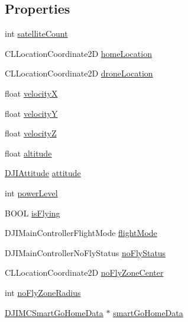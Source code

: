 \subsection*{Properties}
\begin{DoxyCompactItemize}
\item 
int \hyperlink{interface_d_j_i_m_c_system_state_a1d8684af50d70620b9166d2c6a469f63}{satellite\+Count}
\item 
C\+L\+Location\+Coordinate2\+D \hyperlink{interface_d_j_i_m_c_system_state_a4395f4e24d0f084407cf99fdf4d630b2}{home\+Location}
\item 
C\+L\+Location\+Coordinate2\+D \hyperlink{interface_d_j_i_m_c_system_state_a90f991829772ba3e7bb23811845fb2cc}{drone\+Location}
\item 
float \hyperlink{interface_d_j_i_m_c_system_state_a325798d4e0c80ec568fdf36ce1098901}{velocity\+X}
\item 
float \hyperlink{interface_d_j_i_m_c_system_state_aa41385209d9edaef3f4d6ee6385b471b}{velocity\+Y}
\item 
float \hyperlink{interface_d_j_i_m_c_system_state_ab2bee010d83187db9a3ded5456494e8a}{velocity\+Z}
\item 
float \hyperlink{interface_d_j_i_m_c_system_state_a14fa4428eae3c3c96789a44d41d0a8d8}{altitude}
\item 
\hyperlink{struct_d_j_i_attitude}{D\+J\+I\+Attitude} \hyperlink{interface_d_j_i_m_c_system_state_af6916800ba242ddaa3ede17625224021}{attitude}
\item 
int \hyperlink{interface_d_j_i_m_c_system_state_ab39cb3387140f0642d29d865ba33e166}{power\+Level}
\item 
B\+O\+O\+L \hyperlink{interface_d_j_i_m_c_system_state_a7d0f82dcfa7ba2650c394815a0ce9e06}{is\+Flying}
\item 
D\+J\+I\+Main\+Controller\+Flight\+Mode \hyperlink{interface_d_j_i_m_c_system_state_a7ecc5f31a38b34a94f6680f7fc6f590c}{flight\+Mode}
\item 
D\+J\+I\+Main\+Controller\+No\+Fly\+Status \hyperlink{interface_d_j_i_m_c_system_state_ab1d284a6e00a0fed3c262e69d3b738ab}{no\+Fly\+Status}
\item 
C\+L\+Location\+Coordinate2\+D \hyperlink{interface_d_j_i_m_c_system_state_a1840e97a45fe5f712af878e9aec09e0d}{no\+Fly\+Zone\+Center}
\item 
int \hyperlink{interface_d_j_i_m_c_system_state_a79b5f1ed799acf989c4c755523df582a}{no\+Fly\+Zone\+Radius}
\item 
\hyperlink{interface_d_j_i_m_c_smart_go_home_data}{D\+J\+I\+M\+C\+Smart\+Go\+Home\+Data} $\ast$ \hyperlink{interface_d_j_i_m_c_system_state_a66a05759183d6c6bd20b309f274c189a}{smart\+Go\+Home\+Data}
\end{DoxyCompactItemize}


